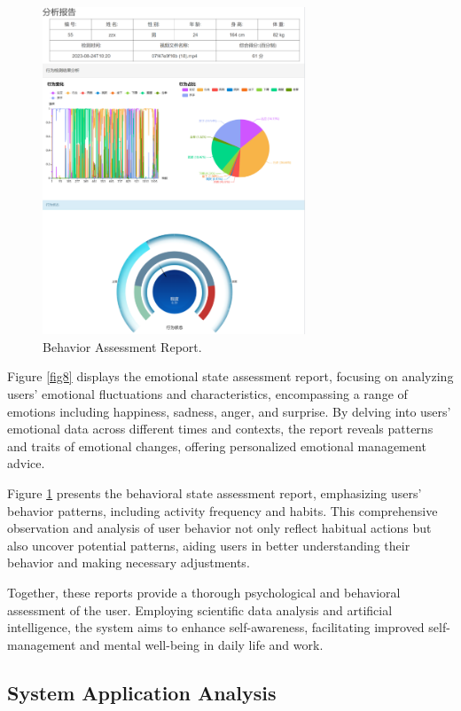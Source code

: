 \documentclass[preprint,12pt]{elsarticle}
\begin{document}
\begin{figure}[!h]%
\centering
\includegraphics[width=0.7\textwidth]{Fig9.png}
\caption{Behavior Assessment Report.}\label{fig9}
\end{figure}

Figure \ref{fig8} displays the emotional state assessment report, focusing on analyzing users' emotional fluctuations and characteristics, encompassing a range of emotions including happiness, sadness, anger, and surprise. By delving into users' emotional data across different times and contexts, the report reveals patterns and traits of emotional changes, offering personalized emotional management advice.

Figure \ref{fig9}  presents the behavioral state assessment report, emphasizing users' behavior patterns, including activity frequency and habits. This comprehensive observation and analysis of user behavior not only reflect habitual actions but also uncover potential patterns, aiding users in better understanding their behavior and making necessary adjustments.

Together, these reports provide a thorough psychological and behavioral assessment of the user. Employing scientific data analysis and artificial intelligence, the system aims to enhance self-awareness, facilitating improved self-management and mental well-being in daily life and work.




\subsection{System Application Analysis}
\end{document}
